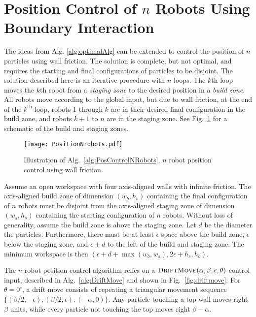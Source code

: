 

\section{Position Control of $n$ Robots Using Boundary Interaction}\label{sec:PostionControlnRobots}
The ideas from Alg. \ref{alg:optimalAlg}  can be extended to control the position of $n$ particles using wall friction.
The solution is complete, but not optimal, and requires the starting and final configurations of particles to be disjoint.
The solution described here is an iterative procedure with $n$ loops. 
 The $k$th loop moves the $k$th robot from a \emph{staging zone} to the desired position in a \emph{build zone}. 
  All robots move according to the global input, but due to wall friction, at the end of the $k^{\text{th}}$ loop, robots 1 through $k$ are in their desired final configuration in the build zone, and robots $k+1$ to $n$ are in the staging zone. 
   See Fig.~\ref{fig:simulationNrobot} for a schematic of the build and staging zones.

\begin{figure}
\begin{center}
	\texttt{[image: PositionNrobots.pdf]}
\end{center}
\vspace{-1em}
\caption{\label{fig:simulationNrobot}
Illustration of Alg.\ \ref{alg:PosControlNRobots}, $n$ robot position control  using wall friction.
}
\end{figure}

Assume an open workspace with four axis-aligned walls with infinite friction.
The axis-aligned build zone of dimension $(w_b, h_b)$ containing the final configuration of $n$ robots must be disjoint from the axis-aligned staging zone of dimension $(w_s, h_s)$  containing the starting configuration of $n$ robots.
 Without loss of generality, assume the build zone  is above the staging zone.  Let $d$ be the diameter the particles.
Furthermore, there must be at least $\epsilon$ space above the build zone, $\epsilon$ below the staging zone, and $\epsilon + d$ to the left of the build and staging zone.  The minimum workspace is then $(\epsilon + d + \max(w_b,w_s), 2\epsilon + h_s,h_b)$.

The $n$ robot position control algorithm relies on a $\text{\sc DriftMove}(\alpha, \beta, \epsilon,\theta)$ control input, described in Alg.~\ref{alg:DriftMove} and shown in Fig.\  \ref{fig:driftmove}.
For $\theta = 0^\circ$, a drift move consists of repeating a triangular movement sequence $\{ (\beta/2,-\epsilon),(\beta/2,\epsilon),(-\alpha,0)\}$. 
 Any particle touching a top wall moves right $\beta$ units, while every particle not touching the top moves right $\beta-\alpha$.

